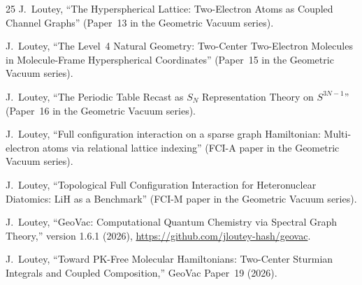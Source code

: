 \documentclass[aps,pra,twocolumn,superscriptaddress,longbibliography,floatfix]{revtex4-2}
\begin{document}
\begin{thebibliography}{25}
J.~Loutey,
``The Hyperspherical Lattice: Two-Electron Atoms as Coupled
Channel Graphs''
(Paper~13 in the Geometric Vacuum series).

J.~Loutey,
``The Level~4 Natural Geometry: Two-Center Two-Electron Molecules
in Molecule-Frame Hyperspherical Coordinates''
(Paper~15 in the Geometric Vacuum series).

J.~Loutey,
``The Periodic Table Recast as $S_N$ Representation Theory on
$S^{3N-1}$''
(Paper~16 in the Geometric Vacuum series).

J.~Loutey,
``Full configuration interaction on a sparse graph Hamiltonian:
Multi-electron atoms via relational lattice indexing''
(FCI-A paper in the Geometric Vacuum series).

J.~Loutey,
``Topological Full Configuration Interaction for Heteronuclear
Diatomics: LiH as a Benchmark''
(FCI-M paper in the Geometric Vacuum series).

J.~Loutey,
``GeoVac: Computational Quantum Chemistry via Spectral Graph Theory,''
version 1.6.1 (2026),
\url{https://github.com/jloutey-hash/geovac}.

J.~Loutey,
``Toward PK-Free Molecular Hamiltonians: Two-Center Sturmian
Integrals and Coupled Composition,''
GeoVac Paper~19 (2026).

\end{thebibliography}
\end{document}
